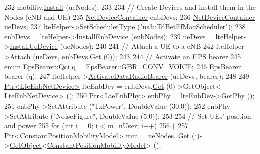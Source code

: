 \begin{DoxyCode}
232   mobility.\hyperlink{classns3_1_1MobilityHelper_a07737960ee95c0777109cf2994dd97ae}{Install} (ueNodes);
233 
234   \textcolor{comment}{// Create Devices and install them in the Nodes (eNB and UE)}
235   \hyperlink{classns3_1_1NetDeviceContainer}{NetDeviceContainer} enbDevs;
236   \hyperlink{classns3_1_1NetDeviceContainer}{NetDeviceContainer} ueDevs;
237   lteHelper->\hyperlink{classns3_1_1LteHelper_a8f86e55b8b80a81732c4b2df00fb25d5}{SetSchedulerType} (\textcolor{stringliteral}{"ns3::TdBetFfMacScheduler"});
238   enbDevs = lteHelper->\hyperlink{classns3_1_1LteHelper_a5e009ad35ef85f46b5a6099263f15a03}{InstallEnbDevice} (enbNodes);
239   ueDevs = lteHelper->\hyperlink{classns3_1_1LteHelper_ac9cd932d7de92811cfa953c2e3b2fc9f}{InstallUeDevice} (ueNodes);
240 
241   \textcolor{comment}{// Attach a UE to a eNB}
242   lteHelper->\hyperlink{classns3_1_1LteHelper_a9466743f826aa2652a87907b7f0a1c87}{Attach} (ueDevs, enbDevs.\hyperlink{classns3_1_1NetDeviceContainer_a677d62594b5c9d2dea155cc5045f4d0b}{Get} (0));
243 
244   \textcolor{comment}{// Activate an EPS bearer}
245   \textcolor{keyword}{enum} \hyperlink{structns3_1_1EpsBearer_aecf0c67109c5eb4ec0b07226fff5885e}{EpsBearer::Qci} q = EpsBearer::GBR\_CONV\_VOICE;
246   \hyperlink{structns3_1_1EpsBearer}{EpsBearer} bearer (q);
247   lteHelper->\hyperlink{classns3_1_1LteHelper_ac896e16cf162e4beeaa292d39ab1b700}{ActivateDataRadioBearer} (ueDevs, bearer);
248 
249   \hyperlink{classns3_1_1Ptr}{Ptr<LteEnbNetDevice>} lteEnbDev = enbDevs.\hyperlink{classns3_1_1NetDeviceContainer_a677d62594b5c9d2dea155cc5045f4d0b}{Get} (0)->GetObject<
      \hyperlink{classns3_1_1LteEnbNetDevice}{LteEnbNetDevice}> ();
250   \hyperlink{classns3_1_1Ptr}{Ptr<LteEnbPhy>} enbPhy = lteEnbDev->\hyperlink{classns3_1_1LteEnbNetDevice_a58db72130e0740f16a5e03b22e4a10a4}{GetPhy} ();
251   enbPhy->SetAttribute (\textcolor{stringliteral}{"TxPower"}, DoubleValue (30.0));
252   enbPhy->SetAttribute (\textcolor{stringliteral}{"NoiseFigure"}, DoubleValue (5.0));
253 
254   \textcolor{comment}{// Set UEs' position and power}
255   \textcolor{keywordflow}{for} (\textcolor{keywordtype}{int} \hyperlink{bernuolliDistribution_8m_a6f6ccfcf58b31cb6412107d9d5281426}{i} = 0; \hyperlink{bernuolliDistribution_8m_a6f6ccfcf58b31cb6412107d9d5281426}{i} < \hyperlink{classLenaTdBetFfMacSchedulerTestCase1_a473de037622baa2f40e541ac9dd1b85c}{m\_nUser}; \hyperlink{bernuolliDistribution_8m_a6f6ccfcf58b31cb6412107d9d5281426}{i}++)
256     \{
257       \hyperlink{classns3_1_1Ptr}{Ptr<ConstantPositionMobilityModel>} mm = ueNodes.
      \hyperlink{classns3_1_1NodeContainer_a9ed96e2ecc22e0f5a3d4842eb9bf90bf}{Get} (\hyperlink{bernuolliDistribution_8m_a6f6ccfcf58b31cb6412107d9d5281426}{i})->\hyperlink{classns3_1_1Object_a13e18c00017096c8381eb651d5bd0783}{GetObject}<\hyperlink{classns3_1_1ConstantPositionMobilityModel}{ConstantPositionMobilityModel}> ();

\end{DoxyCode}
